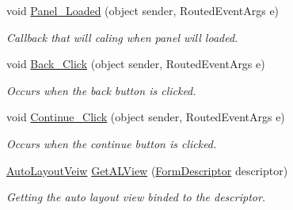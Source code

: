 \begin{DoxyCompactItemize}
void \mbox{\hyperlink{class_wpf_handler_1_1_u_i_1_1_controls_1_1_logon_1_1_registration_panel_a6abb5b99b94ba3347502fccc5bb81ea1}{Panel\+\_\+\+Loaded}} (object sender, Routed\+Event\+Args e)
\begin{DoxyCompactList}\small\item\em Callback that will caling when panel will loaded. \end{DoxyCompactList}\item 
void \mbox{\hyperlink{class_wpf_handler_1_1_u_i_1_1_controls_1_1_logon_1_1_registration_panel_a2c567c0e5aebf72fe34fe3fd59670407}{Back\+\_\+\+Click}} (object sender, Routed\+Event\+Args e)
\begin{DoxyCompactList}\small\item\em Occurs when the back button is clicked. \end{DoxyCompactList}\item 
void \mbox{\hyperlink{class_wpf_handler_1_1_u_i_1_1_controls_1_1_logon_1_1_registration_panel_a0a4dbd47b2f2f5258a1145c3597f5c28}{Continue\+\_\+\+Click}} (object sender, Routed\+Event\+Args e)
\begin{DoxyCompactList}\small\item\em Occurs when the continue button is clicked. \end{DoxyCompactList}\item 
\mbox{\hyperlink{class_wpf_handler_1_1_u_i_1_1_auto_layout_1_1_controls_1_1_auto_layout_veiw}{Auto\+Layout\+Veiw}} \mbox{\hyperlink{class_wpf_handler_1_1_u_i_1_1_controls_1_1_logon_1_1_registration_panel_a551818f7158462bf02d1733e83768197}{Get\+A\+L\+View}} (\mbox{\hyperlink{class_wpf_handler_1_1_u_i_1_1_auto_layout_1_1_form_descriptor}{Form\+Descriptor}} descriptor)
\begin{DoxyCompactList}\small\item\em Getting the auto layout view binded to the descriptor. \end{DoxyCompactList}\end{DoxyCompactItemize}

